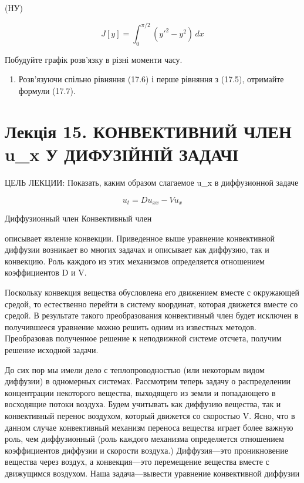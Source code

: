 \documentclass[
  ukrainian,
]{article}
\providecommand{\tightlist}{%
  \setlength{\itemsep}{0pt}\setlength{\parskip}{0pt}}
\begin{document}
(НУ)

\[
J[y] = \int_{0}^{\pi/2} (y'^{2} - y^{2})\,dx
\]

Побудуйте графік розв'язку в різні моменти часу.

\begin{enumerate}
\def\labelenumi{\arabic{enumi}.}
\setcounter{enumi}{4}
\tightlist
\item
  Розв'язуючи спільно рівняння (17.6) і перше рівняння з (17.5),
  отримайте формули (17.7).
\end{enumerate}

\section{Лекція 15. КОНВЕКТИВНИЙ ЧЛЕН u\_x У ДИФУЗІЙНІЙ
ЗАДАЧІ}\label{ux43bux435ux43aux446ux456ux44f-15.-ux43aux43eux43dux432ux435ux43aux442ux438ux432ux43dux438ux439-ux447ux43bux435ux43d-u_x-ux443-ux434ux438ux444ux443ux437ux456ux439ux43dux456ux439-ux437ux430ux434ux430ux447ux456}

ЦЕЛЬ ЛЕКЦИИ: Показать, каким образом слагаемое u\_x в диффузионной
задаче

\[
u_t = Du_{xx} - Vu_x
\]

Диффузионный член Конвективный член

описывает явление конвекции. Приведенное выше уравнение конвективной
диффузии возникает во многих задачах и описывает как диффузию, так и
конвекцию. Роль каждого из этих механизмов определяется отношением
коэффициентов D и V.

Поскольку конвекция вещества обусловлена его движением вместе с
окружающей средой, то естественно перейти в систему координат, которая
движется вместе со средой. В результате такого преобразования
конвективный член будет исключен в получившееся уравнение можно решить
одним из известных методов. Преобразовав полученное решение к
неподвижной системе отсчета, получим решение исходной задачи.

До сих пор мы имели дело с теплопроводностью (или некоторым видом
диффузии) в одномерных системах. Рассмотрим теперь задачу о
распределении концентрации некоторого вещества, выходящего из земли и
попадающего в восходящие потоки воздуха. Будем учитывать как диффузию
вещества, так и конвективный перенос воздухом, который движется со
скоростью V. Ясно, что в данном случае конвективный механизм переноса
вещества играет более важную роль, чем диффузионный (роль каждого
механизма определяется отношением коэффициентов диффузии и скорости
воздуха.) Диффузия---это проникновение вещества через воздух, а
конвекция---это перемещение вещества вместе с движущимся воздухом. Наша
задача---вывести уравнение конвективной диффузии
\end{document}
